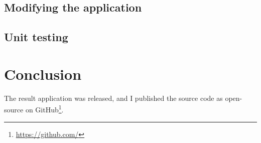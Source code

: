 \section{Modifying the application}

\section{Unit testing}


\chapter{Conclusion}
\label{ch_conclusion}

The result application was released, and I published the source code as open-source on GitHub\footnote{\url{https://github.com/}}.

